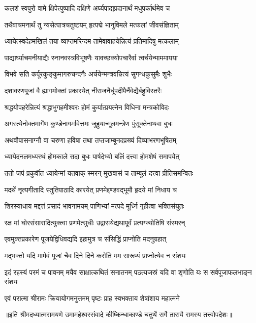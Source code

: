 \twolineshloka
{कलशं स्वपुरो वामे क्षिपेत्पुष्पादि दक्षिणे}
{अर्घ्यपाद्यप्रदानार्थं मधुपर्कार्थमेव च} %

\twolineshloka
{तथैवाचमनार्थं तु न्यसेत्पात्रचतुष्टयम्}
{हृत्पद्मे भानुविमले मत्कलां जीवसंज्ञिताम्} %

\twolineshloka
{ध्यायेत्स्वदेहमखिलं तया व्याप्तमरिन्दम}
{तामेवावाहयेन्नित्यं प्रतिमादिषु मत्कलाम्} %

\twolineshloka
{पाद्यार्घ्याचमनीयाद्यैः स्नानवस्त्रविभूषणैः}
{यावच्छक्योपचारैर्वा त्वर्चयेन्माममायया} %

\twolineshloka
{विभवे सति कर्पूरकुङ्कुमागरुचन्दनैः}
{अर्चयेन्मन्त्रवन्नित्यं सुगन्धकुसुमैः शुभैः} %

\twolineshloka
{दशावरणपूजां वै ह्यागमोक्तां प्रकारयेत्}
{नीराजनैर्धूपदीपैर्नैवेद्यैर्बहुविस्तरैः} %

\twolineshloka
{श्रद्धयोपहरेन्नित्यं श्रद्धाभुगहमीश्वरः}
{होमं कुर्यात्प्रयत्नेन विधिना मन्त्रकोविदः} %

\twolineshloka
{अगस्त्येनोक्तमार्गेण कुण्डेनागमवित्तमः}
{जुहुयान्मूलमन्त्रेण पुंसूक्तेनाथवा बुधः} %

\twolineshloka
{अथवौपासनाग्नौ वा चरुणा हविषा तथा}
{तप्तजाम्बूनदप्रख्यं दिव्याभरणभूषितम्} %

\twolineshloka
{ध्यायेदनलमध्यस्थं होमकाले सदा बुधः}
{पार्षदेभ्यो बलिं दत्त्वा होमशेषं समापयेत्} %

\twolineshloka
{ततो जपं प्रकुर्वीत ध्यायेन्मां यतवाक् स्मरन्}
{मुखवासं च ताम्बूलं दत्त्वा प्रीतिसमन्वितः} %

\twolineshloka
{मदर्थे नृत्यगीतादि स्तुतिपाठादि कारयेत्}
{प्रणमेद्दण्डवद्भूमौ हृदये मां निधाय च} %

\twolineshloka
{शिरस्याधाय मद्दत्तं प्रसादं भावनामयम्}
{पाणिभ्यां मत्पदे मूर्ध्नि गृहीत्वा भक्तिसंयुतः} %

\twolineshloka
{रक्ष मां घोरसंसारादित्युक्त्वा प्रणमेत्सुधीः}
{उद्वासयेद्यथापूर्वं प्रत्यग्ज्योतिषि संस्मरन्} %

\twolineshloka
{एवमुक्तप्रकारेण पूजयेद्विधिवद्यदि}
{इहामुत्र च संसिद्धिं प्राप्नोति मदनुग्रहात्} %

\twolineshloka
{मद्भक्तो यदि मामेवं पूजां चैव दिने दिने}
{करोति मम सारूप्यं प्राप्नोत्येव न संशयः} %

\fourlineindentedshloka
{इदं रहस्यं परमं च पावनम्}
{मयैव साक्षात्कथितं सनातनम्}
{पठत्यजस्रं यदि वा शृणोति यः}
{स सर्वपूजाफलभाङ्न संशयः} %

\twolineshloka
{एवं परात्मा श्रीरामः क्रियायोगमनुत्तमम्}
{पृष्टः प्राह स्वभक्ताय शेषांशाय महात्मने} %



{॥इति श्रीमदध्यात्मरामयणे उमामहेश्वरसंवादे
कीष्किन्धाकाण्डे चतुर्थे सर्गे  तारायै  रामस्य  तत्त्वोपदेशः॥}
